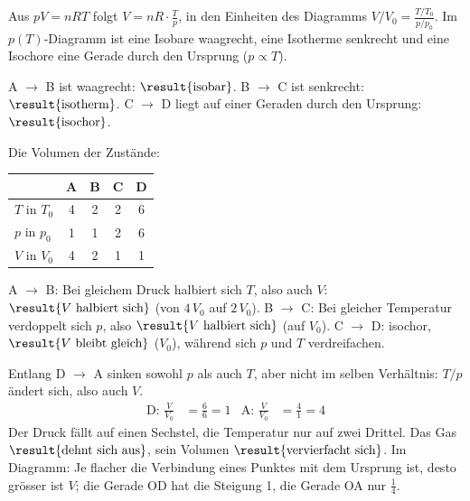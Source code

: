 Aus $pV = nRT$ folgt $V = nR\cdot\frac{T}{p}$, in den Einheiten des Diagramms $V/V_0 = \frac{T/T_0}{p/p_0}$. Im $p(T)$-Diagramm ist eine Isobare waagrecht, eine Isotherme senkrecht und eine Isochore eine Gerade durch den Ursprung ($p \propto T$).
\begin{abcliste}
\abc A $\to$ B ist waagrecht: $\result{\text{isobar}}$. B $\to$ C ist senkrecht: $\result{\text{isotherm}}$. C $\to$ D liegt auf einer Geraden durch den Ursprung: $\result{\text{isochor}}$.

\abc Die Volumen der Zustände:
\begin{center}
\begin{tabular}{lcccc}
 & A & B & C & D \\ \hline
 $T$ in $T_0$ & 4 & 2 & 2 & 6 \\
 $p$ in $p_0$ & 1 & 1 & 2 & 6 \\
 $V$ in $V_0$ & 4 & 2 & 1 & 1
\end{tabular}
\end{center}
A $\to$ B: Bei gleichem Druck halbiert sich $T$, also auch $V$: $\result{V \text{ halbiert sich}}$ (von $4\,V_0$ auf $2\,V_0$). B $\to$ C: Bei gleicher Temperatur verdoppelt sich $p$, also $\result{V \text{ halbiert sich}}$ (auf $V_0$). C $\to$ D: isochor, $\result{V \text{ bleibt gleich}}$ ($V_0$), während sich $p$ und $T$ verdreifachen.

\abc Entlang D $\to$ A sinken sowohl $p$ als auch $T$, aber nicht im selben Verhältnis: $T/p$ ändert sich, also auch $V$.
\begin{align}
 \text{D: } \frac{V}{V_0} &= \frac{6}{6} = 1 & \text{A: } \frac{V}{V_0} &= \frac{4}{1} = 4
\end{align}
Der Druck fällt auf einen Sechstel, die Temperatur nur auf zwei Drittel. Das Gas $\result{\text{dehnt sich aus}}$, sein Volumen $\result{\text{vervierfacht sich}}$. Im Diagramm: Je flacher die Verbindung eines Punktes mit dem Ursprung ist, desto grösser ist $V$; die Gerade OD hat die Steigung 1, die Gerade OA nur $\frac14$.
\end{abcliste}
